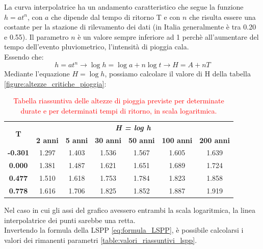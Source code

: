 La curva interpolatrice ha un andamento caratteristico che segue la funzione $h=at^n$, con $a$ che dipende dal tempo di ritorno T e con $n$ che risulta essere una costante per la stazione di rilevamento dei dati (in Italia generalmente è tra 0.20 e 0.55). Il parametro $n$ è un valore sempre inferiore ad 1 perchè all'aumentare del tempo dell'evento pluviometrico, l'intensità di pioggia cala.\\
Essendo che:
\begin{equation}
    h=at^n \rightarrow \log h = \log a + n \log t \rightarrow H=A+nT
    \label{eq:formula_LSPP}
\end{equation}
Mediante l'equazione $H = \log h$, possiamo calcolare il valore di H della tabella \eqref{figure:altezze_critiche_pioggia}:

\begin{table}[H] \centering
    \caption{\textcolor{red}{Tabella riassuntiva delle altezze di pioggia previste per determinate durate e per determinati tempi di ritorno, in scala logaritmica.}}
    \begin{tabular}{ccccccc}
        \toprule
    \multirow{2}{*}{\textbf{T}} & \multicolumn{6}{c}{\textit{\textbf{H = log h}}}                                                            \\ & \textbf{2 anni} & \textbf{5 anni} & \textbf{30 anni} & \textbf{50 anni} & \textbf{100 anni} & \textbf{200 anni} \\
    \textbf{-0.301}             & 1.297           & 1.403           & 1.536            & 1.567            & 1.605             & 1.639             \\
    \textbf{0.000}              & 1.381           & 1.487           & 1.621            & 1.651            & 1.689             & 1.724             \\
    \textbf{0.477}              & 1.510           & 1.618           & 1.753            & 1.784            & 1.823             & 1.858             \\
    \textbf{0.778}              & 1.616           & 1.706           & 1.825            & 1.852            & 1.887             & 1.919  \\
    \bottomrule          
    \end{tabular}
    \end{table}
Nel caso in cui gli assi del grafico avessero entrambi la scala logaritmica, la linea interpolatrice dei punti sarebbe una retta.\\
Invertendo la formula della LSPP \eqref{eq:formula_LSPP}, è possibile calcolarsi i valori dei rimanenti parametri \eqref{table:valori_riassuntivi_lspp}.
